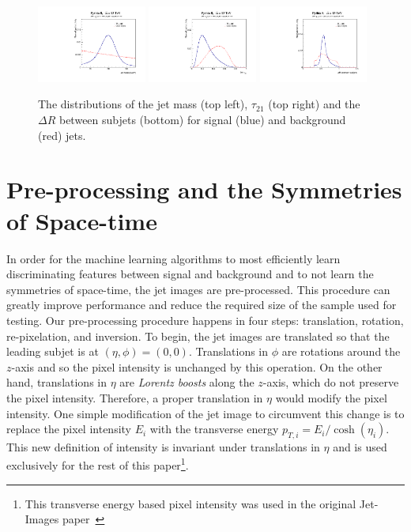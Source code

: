 \begin{figure}[htbp!]
  \begin{center}
        \includegraphics[width=0.32\textwidth]{figures/mass.pdf} 
        \includegraphics[width=0.32\textwidth]{figures/tau21.pdf} 
        \includegraphics[width=0.32\textwidth]{figures/dR.pdf}
      \caption{ The distributions of the jet mass (top left), $\tau_{21}$ (top right) and the $\Delta R$ between subjets (bottom) for signal (blue) and background (red) jets.
      \label{fig:datastats} }
    \end{center}
\end{figure}


\section{Pre-processing and the Symmetries of Space-time}
\label{sec:preprocess}

In order for the machine learning algorithms to most efficiently learn discriminating features between signal and background and to not learn the symmetries of space-time, the jet images are pre-processed.  This procedure can greatly improve performance and reduce the required size of the sample used for testing.  Our pre-processing procedure happens in four steps: translation, rotation, re-pixelation, and inversion.  To begin, the jet images are translated so that the leading subjet is at $(\eta,\phi)=(0,0)$.  Translations in $\phi$ are rotations around the $z$-axis and so the pixel intensity is unchanged by this operation.  On the other hand, translations in $\eta$ are {\it Lorentz boosts} along the $z$-axis, which do not preserve the pixel intensity.  Therefore, a proper translation in $\eta$ would modify the pixel intensity.  One simple modification of the jet image to circumvent this change is to replace the pixel intensity $E_i$ with the transverse energy $p_{T,i}=E_i/\cosh(\eta_i)$.  This new definition of intensity is invariant under translations in $\eta$ and is used exclusively for the rest of this paper\footnote{This transverse energy based pixel intensity was used in the original Jet-Images paper~\cite{JetImages}}.

